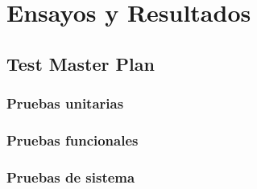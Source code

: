
\chapter{Ensayos y Resultados} %

\label{Chapter4} %


\section{Test Master Plan}
\label{sec:masterPlan}

\subsection{Pruebas unitarias}
\label{subsec:unitarias}

\subsection{Pruebas funcionales}
\label{subsec:pruebasFuncionales}

\subsection{Pruebas de sistema}
\label{subsec:pruebasSistema}
